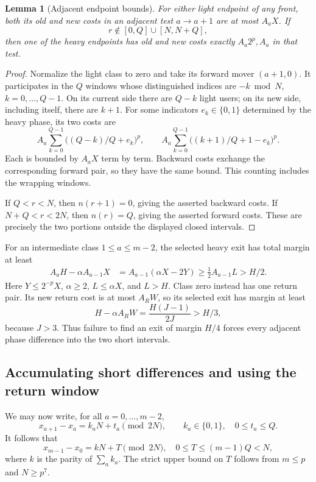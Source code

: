 \documentclass[11pt]{article}
\newtheorem{lemma}[theorem]{Lemma}
\theoremstyle{definition}
\theoremstyle{remark}
\begin{document}
\begin{lemma}[Adjacent endpoint bounds]\label{lem:endpoints}
For either light endpoint of any front, both its old and new costs in an adjacent test $a\to a+1$ are at most $A_aX$. If
\[
 r\notin[0,Q]\cup[N,N+Q],
\]
then one of the heavy endpoints has old and new costs exactly $A_a2^p,A_a$ in that test.
\end{lemma}
\begin{proof}
Normalize the light class to zero and take its forward mover $(a+1,0)$. It participates in the $Q$ windows whose distinguished indices are $-k\bmod N$, $k=0,\ldots,Q-1$. On its current side there are $Q-k$ light users; on its new side, including itself, there are $k+1$. For some indicators $e_k\in\{0,1\}$ determined by the heavy phase, its two costs are
\[
 A_a\sum_{k=0}^{Q-1}\big((Q-k)/Q+e_k\big)^p,
 \qquad
 A_a\sum_{k=0}^{Q-1}\big((k+1)/Q+1-e_k\big)^p.
\]
Each is bounded by $A_aX$ term by term. Backward costs exchange the corresponding forward pair, so they have the same bound. This counting includes the wrapping windows.

If $Q<r<N$, then $n(r+1)=0$, giving the asserted backward costs. If $N+Q<r<2N$, then $n(r)=Q$, giving the asserted forward costs. These are precisely the two portions outside the displayed closed intervals.
\end{proof}

For an intermediate class $1\le a\le m-2$, the selected heavy exit has total margin at least
\begin{align}\label{eq:intermediateexit}
 A_aH-\alpha A_{a-1}X
 &=A_{a-1}(\alpha X-2Y)
 \ge\tfrac12 A_{a-1}L>H/2.
\end{align}
Here $Y\le2^{-p}X$, $\alpha\ge2$, $L\le\alpha X$, and $L>H$. Class zero instead has one return pair. Its new return cost is at most $A_RW$, so its selected exit has margin at least
\begin{equation}\label{eq:firstexit}
 H-\alpha A_RW=\frac{H(J-1)}{2J}>H/3,
\end{equation}
because $J>3$. Thus failure to find an exit of margin $H/4$ forces every adjacent phase difference into the two short intervals.

\subsection{Accumulating short differences and using the return window}
We may now write, for all $a=0,\ldots,m-2$,
\[
 x_{a+1}-x_a=k_aN+t_a\pmod{2N},
 \qquad k_a\in\{0,1\},\quad0\le t_a\le Q.
\]
It follows that
\begin{equation}\label{eq:accumulated}
 x_{m-1}-x_0=kN+T\pmod{2N},\quad
 0\le T\le(m-1)Q<N,
\end{equation}
where $k$ is the parity of $\sum_a k_a$. The strict upper bound on $T$ follows from $m\le p$ and $N\ge p^7$.
\end{document}
